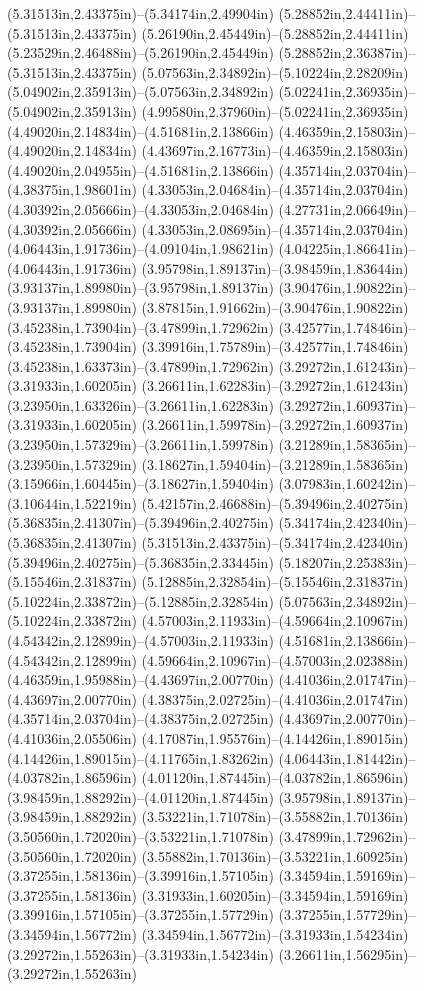 (5.31513in,2.43375in)--(5.34174in,2.49904in) (5.28852in,2.44411in)--(5.31513in,2.43375in) (5.26190in,2.45449in)--(5.28852in,2.44411in) (5.23529in,2.46488in)--(5.26190in,2.45449in) (5.28852in,2.36387in)--(5.31513in,2.43375in) (5.07563in,2.34892in)--(5.10224in,2.28209in) (5.04902in,2.35913in)--(5.07563in,2.34892in) (5.02241in,2.36935in)--(5.04902in,2.35913in) (4.99580in,2.37960in)--(5.02241in,2.36935in) (4.49020in,2.14834in)--(4.51681in,2.13866in) (4.46359in,2.15803in)--(4.49020in,2.14834in) (4.43697in,2.16773in)--(4.46359in,2.15803in) (4.49020in,2.04955in)--(4.51681in,2.13866in) (4.35714in,2.03704in)--(4.38375in,1.98601in) (4.33053in,2.04684in)--(4.35714in,2.03704in) (4.30392in,2.05666in)--(4.33053in,2.04684in) (4.27731in,2.06649in)--(4.30392in,2.05666in) (4.33053in,2.08695in)--(4.35714in,2.03704in) (4.06443in,1.91736in)--(4.09104in,1.98621in) (4.04225in,1.86641in)--(4.06443in,1.91736in) (3.95798in,1.89137in)--(3.98459in,1.83644in) (3.93137in,1.89980in)--(3.95798in,1.89137in) (3.90476in,1.90822in)--(3.93137in,1.89980in) (3.87815in,1.91662in)--(3.90476in,1.90822in) (3.45238in,1.73904in)--(3.47899in,1.72962in) (3.42577in,1.74846in)--(3.45238in,1.73904in) (3.39916in,1.75789in)--(3.42577in,1.74846in) (3.45238in,1.63373in)--(3.47899in,1.72962in) (3.29272in,1.61243in)--(3.31933in,1.60205in) (3.26611in,1.62283in)--(3.29272in,1.61243in) (3.23950in,1.63326in)--(3.26611in,1.62283in) (3.29272in,1.60937in)--(3.31933in,1.60205in) (3.26611in,1.59978in)--(3.29272in,1.60937in) (3.23950in,1.57329in)--(3.26611in,1.59978in) (3.21289in,1.58365in)--(3.23950in,1.57329in) (3.18627in,1.59404in)--(3.21289in,1.58365in) (3.15966in,1.60445in)--(3.18627in,1.59404in) (3.07983in,1.60242in)--(3.10644in,1.52219in) (5.42157in,2.46688in)--(5.39496in,2.40275in) (5.36835in,2.41307in)--(5.39496in,2.40275in) (5.34174in,2.42340in)--(5.36835in,2.41307in) (5.31513in,2.43375in)--(5.34174in,2.42340in) (5.39496in,2.40275in)--(5.36835in,2.33445in) (5.18207in,2.25383in)--(5.15546in,2.31837in) (5.12885in,2.32854in)--(5.15546in,2.31837in) (5.10224in,2.33872in)--(5.12885in,2.32854in) (5.07563in,2.34892in)--(5.10224in,2.33872in) (4.57003in,2.11933in)--(4.59664in,2.10967in) (4.54342in,2.12899in)--(4.57003in,2.11933in) (4.51681in,2.13866in)--(4.54342in,2.12899in) (4.59664in,2.10967in)--(4.57003in,2.02388in) (4.46359in,1.95988in)--(4.43697in,2.00770in) (4.41036in,2.01747in)--(4.43697in,2.00770in) (4.38375in,2.02725in)--(4.41036in,2.01747in) (4.35714in,2.03704in)--(4.38375in,2.02725in) (4.43697in,2.00770in)--(4.41036in,2.05506in) (4.17087in,1.95576in)--(4.14426in,1.89015in) (4.14426in,1.89015in)--(4.11765in,1.83262in) (4.06443in,1.81442in)--(4.03782in,1.86596in) (4.01120in,1.87445in)--(4.03782in,1.86596in) (3.98459in,1.88292in)--(4.01120in,1.87445in) (3.95798in,1.89137in)--(3.98459in,1.88292in) (3.53221in,1.71078in)--(3.55882in,1.70136in) (3.50560in,1.72020in)--(3.53221in,1.71078in) (3.47899in,1.72962in)--(3.50560in,1.72020in) (3.55882in,1.70136in)--(3.53221in,1.60925in) (3.37255in,1.58136in)--(3.39916in,1.57105in) (3.34594in,1.59169in)--(3.37255in,1.58136in) (3.31933in,1.60205in)--(3.34594in,1.59169in) (3.39916in,1.57105in)--(3.37255in,1.57729in) (3.37255in,1.57729in)--(3.34594in,1.56772in) (3.34594in,1.56772in)--(3.31933in,1.54234in) (3.29272in,1.55263in)--(3.31933in,1.54234in) (3.26611in,1.56295in)--(3.29272in,1.55263in) 